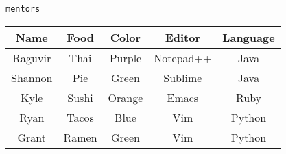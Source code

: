 
\begin{center}
\texttt{mentors}\\
\begin{tabular}{|c|c|c|c|c|}
 \hline
 \textbf{Name} & \textbf{Food} & \textbf{Color} & \textbf{Editor} & \textbf{Language} \\
 \hline
  Raguvir & Thai & Purple & Notepad++ & Java \\
 \hline
  Shannon & Pie & Green & Sublime & Java \\
 \hline
  Kyle & Sushi & Orange & Emacs & Ruby \\
 \hline
  Ryan & Tacos & Blue & Vim & Python \\
 \hline
  Grant & Ramen & Green & Vim & Python \\
 \hline
\end{tabular}
\end{center}
